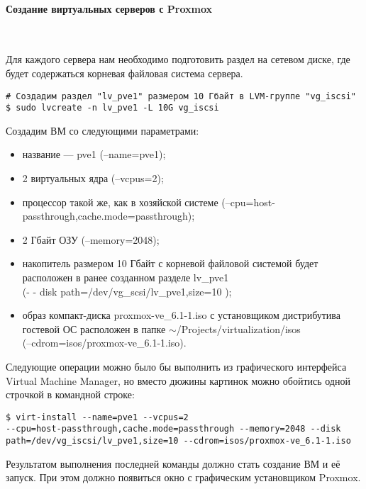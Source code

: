 \documentclass[14pt, a4paper]{article}
\begin{document}
\paragraph*{Создание виртуальных серверов с Proxmox} \mbox{}\\

Для каждого сервера нам необходимо подготовить раздел на сетевом диске, где будет содержаться
корневая файловая система сервера.

\begin{lstlisting}
# Создадим раздел "lv_pve1" размером 10 Гбайт в LVM-группе "vg_iscsi"
$ sudo lvcreate -n lv_pve1 -L 10G vg_iscsi
\end{lstlisting}

Создадим ВМ со следующими параметрами:
\begin{itemize}
    \item название — pve1 (--name=pve1);
    \item 2 виртуальных ядра (--vcpus=2);
    \item процессор такой же, как в хозяйской системе
    (--cpu=host-passthrough,cache.mode=passthrough);
    \item 2 Гбайт ОЗУ (--memory=2048);
    \item накопитель размером 10 Гбайт с корневой файловой системой будет расположен в ранее
    созданном разделе lv\_pve1 \\ (- - disk path=/dev/vg\_scsi/lv\_pve1,size=10 );
    \item образ компакт-диска proxmox-ve\_6.1-1.iso с установщиком дистрибутива гостевой ОС
    расположен в папке $\mathtt{\sim}$/Projects/virtualization/isos \\
    (--cdrom=isos/proxmox-ve\_6.1-1.iso).
\end{itemize}

Следующие операции можно было бы выполнить из графического интерфейса Virtual Machine
Manager, но вместо дюжины картинок можно обойтись одной строчкой в командной строке:
\begin{lstlisting}
$ virt-install --name=pve1 --vcpus=2
--cpu=host-passthrough,cache.mode=passthrough --memory=2048 --disk
path=/dev/vg_iscsi/lv_pve1,size=10 --cdrom=isos/proxmox-ve_6.1-1.iso   
\end{lstlisting}

Результатом выполнения последней команды должно стать создание ВМ и её запуск. При этом
должно появиться окно с графическим установщиком Proxmox.
\end{document}
